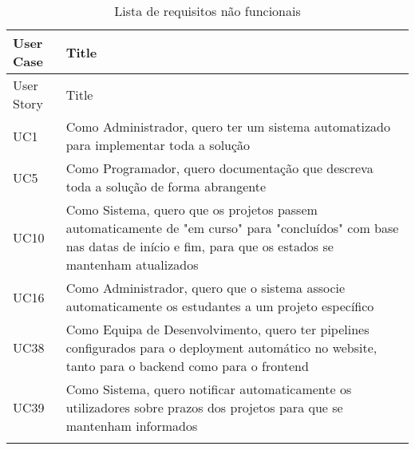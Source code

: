 \begin{landscape}
\begin{longtable}{lp{15cm}}

    \caption{Lista de requisitos não funcionais}
    \hline
    User Case & Title \\ \hline
    \endfirsthead

    \hline
    User Story & Title \\ \hline
    \endhead

    \hline
    \endfoot

    \hline
    \endlastfoot

    UC1 & Como Administrador, quero ter um sistema automatizado para implementar toda a solução \\ \hline
    UC5 & Como Programador, quero documentação que descreva toda a solução de forma abrangente \\ \hline
    UC10 & Como Sistema, quero que os projetos passem automaticamente de "em curso" para "concluídos" com base nas datas de início e fim, para que os estados se mantenham atualizados \\ \hline
    UC16 & Como Administrador, quero que o sistema associe automaticamente os estudantes a um projeto específico \\ \hline
    UC38 & Como Equipa de Desenvolvimento, quero ter pipelines configurados para o deployment automático no website, tanto para o backend como para o frontend \\ \hline
    UC39 & Como Sistema, quero notificar automaticamente os utilizadores sobre prazos dos projetos para que se mantenham informados \\ 


\label{tab:req-nao-funcionais}
\end{longtable}
\end{landscape}
